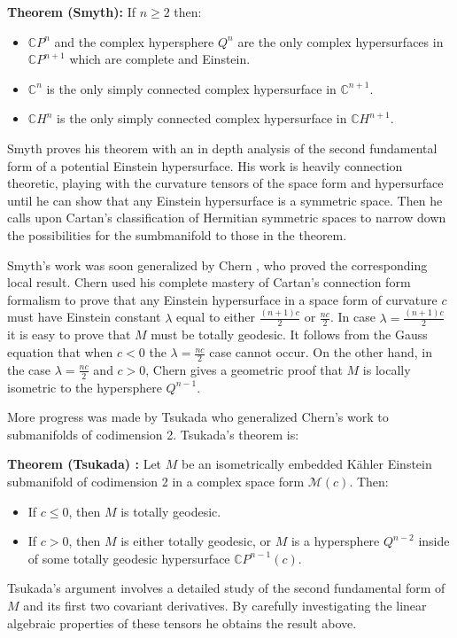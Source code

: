 \documentclass[11pt]{amsart}
\theoremstyle{definition}
\def \CP{ \mathbb{C}P }
\def \C{ \mathbb{C} }
\def \CH{ \mathbb{C}H }
\def \Mamb{ \mathcal{M} }
\begin{document}
{\bf Theorem (Smyth):} If $n \geq 2$ then:
%
\begin{itemize}
\item  $\CP^n$ and the complex hypersphere $Q^n$ are the only complex hypersurfaces in $\CP^{n+1}$ which are complete and Einstein.
\item  $\C^n$ is the only simply connected complex hypersurface in $\C^{n+1}$.
\item  $\CH^n$ is the only simply connected complex hypersurface in $\CH^{n+1}$.
\end{itemize}

Smyth proves his theorem with an in depth analysis of the second fundamental form of a potential Einstein hypersurface.  His work is heavily connection theoretic, playing with the curvature tensors of the space form and hypersurface until he can show that any Einstein hypersurface is a symmetric space.  Then he calls upon Cartan's classification of Hermitian symmetric spaces to narrow down the possibilities for the sumbmanifold to those in the theorem.  

Smyth's work was soon generalized by Chern \cite{Ch}, who proved the corresponding local result.  Chern used his complete mastery of Cartan's connection form formalism to prove that any Einstein hypersurface in a space form of curvature $c$ must have Einstein constant $\lambda$ equal to either $\frac{(n+1)c}{2}$ or $\frac{nc}{2}$.  In case $\lambda = \frac{(n+1)c}{2}$ it is easy to prove that $M$ must be totally geodesic.  It follows from the Gauss equation that when $c<0$ the $\lambda = \frac{nc}{2}$ case cannot occur.  On the other hand, in the case $\lambda = \frac{nc}{2}$ and $c>0$, Chern gives a geometric proof that $M$ is locally isometric to the hypersphere $Q^{n-1}$.

More progress was made by Tsukada \cite{T} who generalized Chern's work to submanifolds of codimension 2.  Tsukada's theorem is:

{\bf Theorem (Tsukada) : } Let $M$ be an isometrically embedded K\"{a}hler Einstein submanifold of codimension 2 in a complex space form $\Mamb(c)$.  Then:
%
\begin{itemize}
\item If $c \leq 0$, then $M$ is totally geodesic.
\item If $c > 0$, then $M$ is either totally geodesic, or $M$ is a hypersphere $Q^{n-2}$ inside of some totally geodesic hypersurface $\CP^{n-1}(c)$.
\end{itemize}

Tsukada's argument involves a detailed study of the second fundamental form of $M$ and its first two covariant derivatives.  By carefully investigating the linear algebraic properties of these tensors he obtains the result above.
\end{document}
